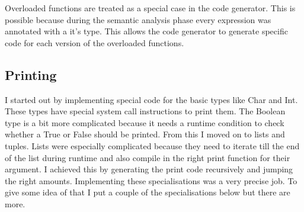 \documentclass{report}
\begin{document}
Overloaded functions are treated as a special case in the code generator. This is possible because during the semantic analysis phase every expression was annotated with a it's type. This allows the code generator to generate specific code for each version of the overloaded functions. 

\subsection{Printing}

I started out by implementing special code for the basic types like Char and Int. These types have special system call instructions to print them. The Boolean type is a bit more complicated because it needs a runtime condition to check whether a True or False should be printed. From this I moved on to lists and tuples. Lists were especially complicated because they need to iterate till the end of the list during runtime and also compile in the right print function for their argument. I achieved this by generating the print code recursively and jumping the right amounts. Implementing these specialisations was a very precise job. To give some idea of that I put a couple of the specialisations below but there are more. 
\end{document}
